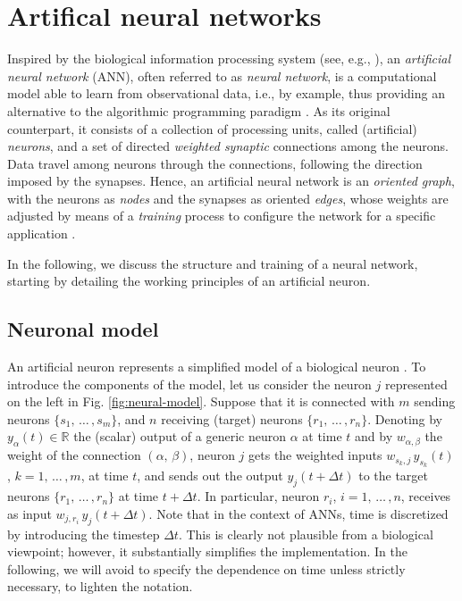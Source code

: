 \documentclass[longtitle]{elsarticle}
\numberwithin{equation}{section}
\theoremstyle{theorem}
\theoremstyle{definition}
\theoremstyle{remark}
\theoremstyle{proposition}
\numberwithin{figure}{section}
\begin{document}
	
	\section{Artifical neural networks}
	\label{section:Artificial neural networks}
	
		Inspired by the biological information processing system (see, e.g., \cite{Hay05, Kri07}), an \emph{artificial neural network} (ANN), often referred to as \emph{neural network}, is a computational model able to learn from observational data, i.e., by example, thus providing an alternative to the algorithmic programming paradigm \cite{Nie15}. As its original counterpart, it consists of a collection of processing units, called (artificial) \emph{neurons}, and a set of directed \emph{weighted synaptic} connections among the neurons. Data travel among neurons through the connections, following the direction imposed by the synapses. Hence, an artificial neural network is an \emph{oriented graph}, with the neurons as \emph{nodes} and the synapses as oriented \emph{edges}, whose weights are adjusted by means of a \emph{training} process to configure the network for a specific application \cite{SD13}. 
		
		In the following, we discuss the structure and training of a neural network, starting by detailing the working principles of an artificial neuron.  
		
				
											
	\subsection{Neuronal model}
	\label{section:Neuronal model}
	
		An artificial neuron represents a simplified model of a biological neuron \cite{Kri07}. To introduce the components of the model, let us consider the neuron $j$ represented on the left in Fig. \ref{fig:neural-model}. Suppose that it is connected with $m$ sending neurons $\big\lbrace s_1, \, \ldots \, , s_m \big\rbrace$, and $n$ receiving (target) neurons $\big\lbrace r_1, \, \ldots \, , r_n \big\rbrace$. Denoting by $y_{\alpha}(t) \in \mathbb{R}$ the (scalar) output of a generic neuron $\alpha$ at time $t$ and by $w_{\alpha,\beta}$ the weight of the connection $(\alpha, \, \beta)$, neuron $j$ gets the weighted inputs $w_{s_k,j} \, y_{s_k}(t)$, $k = 1, \, \ldots \, , m$, at time $t$, and sends out the output $y_j(t + \Delta t)$ to the target neurons $\big\lbrace r_1, \, \ldots \, , r_n \big\rbrace$ at time $t + \Delta t$. In particular, neuron $r_i$, $i = 1, \, \ldots \, , n$, receives as input $w_{j,r_i} \, y_j(t + \Delta t)$. Note that in the context of ANNs, time is discretized by introducing the timestep $\Delta t$. This is clearly not plausible from a biological viewpoint; however, it substantially simplifies the implementation. In the following, we will avoid to specify the dependence on time unless strictly necessary, to lighten the notation.
		
\end{document}
